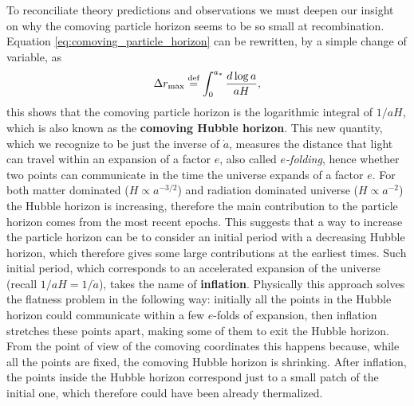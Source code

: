 To reconciliate theory predictions and observations we must deepen our insight on why the comoving particle horizon seems to be so small at recombination. Equation \eqref{eq:comoving_particle_horizon} can be rewritten, by a simple change of variable, as
$$\Delta r_{\text{max}}\stackrel{\text{def}}{=}\int_0^{a_{*}}\frac{d\log a}{aH},$$
this shows that the comoving particle horizon is the logarithmic integral of $1/aH$, which is also known as the \textbf{comoving Hubble horizon}. This new quantity, which we recognize to be just the inverse of $\dot a$, measures the distance that light can travel within an expansion of a factor $e$, also called \emph{$e$-folding}, hence whether two points can communicate in the time the universe expands of a factor $e$. For both matter dominated ($H\propto a^{-3/2}$) and radiation dominated universe ($H\propto a ^{-2}$) the Hubble horizon is increasing, therefore the main contribution to the particle horizon comes from the most recent epochs. This suggests that a way to increase the particle horizon can be to consider an initial period with a decreasing Hubble horizon, which therefore gives some large contributions at the earliest times. Such initial period, which corresponds to an accelerated expansion of the universe (recall $1/aH=1/\dot a$), takes the name of \textbf{inflation}. Physically this approach solves the flatness problem in the following way: initially all the points in the Hubble horizon could communicate within a few $e$-folds of expansion, then inflation stretches these points apart, making some of them to exit the Hubble horizon. From the point of view of the comoving coordinates this happens because, while all the points are fixed, the comoving Hubble horizon is shrinking. After inflation, the points inside the Hubble horizon correspond just to a small patch of the initial one, which therefore could have been already thermalized.

